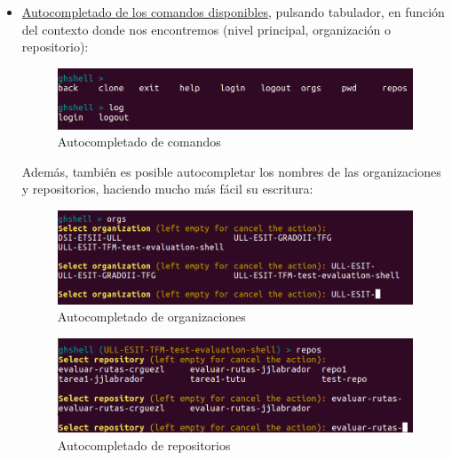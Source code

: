 \begin{itemize}
	\item \underline{Autocompletado de los comandos disponibles}, pulsando tabulador, en función del contexto donde nos encontremos (nivel principal, organización o repositorio):
	
		\begin{figure}[H]
		\begin{center}
		\includegraphics[width=1\textwidth]{images/tab1-1}
		\caption{Autocompletado de comandos}
		\label{fig:tab1-1}
		\end{center}
		\end{figure}
	
	
	Además, también es posible autocompletar los nombres de las organizaciones y repositorios, haciendo mucho más fácil su escritura:
	
		\begin{figure}[H]
		\begin{center}
		\includegraphics[width=1\textwidth]{images/tab1-2}
		\caption{Autocompletado de organizaciones}
		\label{fig:tab1-1}
		\end{center}
		\end{figure}
		
		\begin{figure}[H]
		\begin{center}
		\includegraphics[width=1\textwidth]{images/tab1-3}
		\caption{Autocompletado de repositorios}
		\label{fig:tab1-1}
		\end{center}
		\end{figure}
	

\end{itemize}
